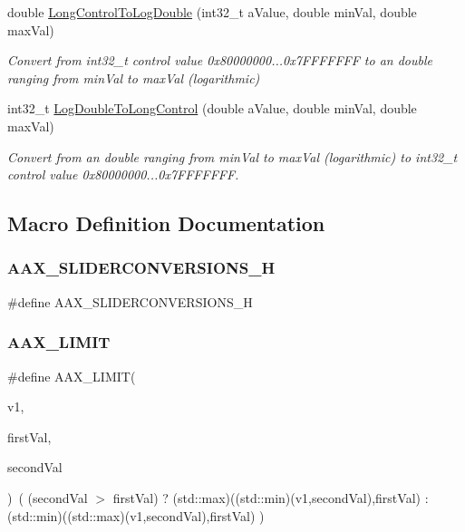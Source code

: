 \begin{DoxyCompactItemize}
double \mbox{\hyperlink{a00674_ae8dc426096379e56390b687762c79665}{Long\+Control\+To\+Log\+Double}} (int32\+\_\+t a\+Value, double min\+Val, double max\+Val)
\begin{DoxyCompactList}\small\item\em Convert from int32\+\_\+t control value 0x80000000...0x7\+F\+F\+F\+F\+F\+FF to an double ranging from min\+Val to max\+Val (logarithmic) \end{DoxyCompactList}\item 
int32\+\_\+t \mbox{\hyperlink{a00674_ad5428b221d38f3503f1c168b6873d2c2}{Log\+Double\+To\+Long\+Control}} (double a\+Value, double min\+Val, double max\+Val)
\begin{DoxyCompactList}\small\item\em Convert from an double ranging from min\+Val to max\+Val (logarithmic) to int32\+\_\+t control value 0x80000000...0x7\+F\+F\+F\+F\+F\+FF. \end{DoxyCompactList}\end{DoxyCompactItemize}


\subsection{Macro Definition Documentation}
\mbox{\label{a00674_a8676d067980b7fb9a1f53cfa5dbc048a}} 
\subsubsection{\texorpdfstring{AAX\_SLIDERCONVERSIONS\_H}{AAX\_SLIDERCONVERSIONS\_H}}
{\footnotesize\ttfamily \#define A\+A\+X\+\_\+\+S\+L\+I\+D\+E\+R\+C\+O\+N\+V\+E\+R\+S\+I\+O\+N\+S\+\_\+H}

\mbox{\label{a00674_af5bd671969b131ba73e1651befa4f51f}} 
\subsubsection{\texorpdfstring{AAX\_LIMIT}{AAX\_LIMIT}}
{\footnotesize\ttfamily \#define A\+A\+X\+\_\+\+L\+I\+M\+IT(\begin{DoxyParamCaption}\item[{}]{v1,  }\item[{}]{first\+Val,  }\item[{}]{second\+Val }\end{DoxyParamCaption})~( (second\+Val $>$ first\+Val) ? (std\+::max)((std\+::min)(v1,second\+Val),first\+Val) \+:  (std\+::min)((std\+::max)(v1,second\+Val),first\+Val) )}



